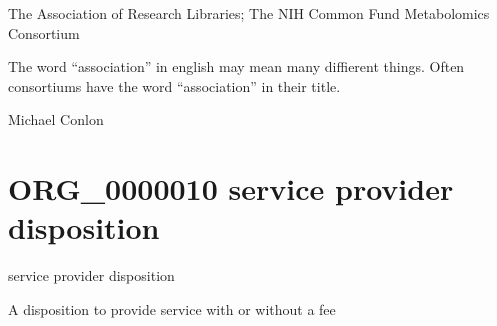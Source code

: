 \documentclass[letterpaper,10pt,english]{sphinxmanual}
\begin{document}
\begin{sphinxShadowBox}

\sphinxAtStartPar
The Association of Research Libraries; The NIH Common Fund Metabolomics Consortium
\end{sphinxShadowBox}

\begin{sphinxShadowBox}

\sphinxAtStartPar
The word “association” in english may mean many diffierent things.  Often consortiums have the word “association” in their title.
\end{sphinxShadowBox}

\begin{sphinxShadowBox}

\sphinxAtStartPar
Michael Conlon 
\end{sphinxShadowBox}
\begin{quote}
\label{\detokenize{doc-ORG_0000010:org-0000010}}\label{\detokenize{doc-ORG_0000010:service-provider-disposition}}\label{\detokenize{doc-ORG_0000010:org-0000010}}
\ignorespaces \end{quote}


\section{ORG\_0000010 \sphinxhyphen{} service provider disposition}
\label{\detokenize{doc-ORG_0000010:org-0000010-service-provider-disposition}}\label{\detokenize{doc-ORG_0000010:index-0}}\label{\detokenize{doc-ORG_0000010::doc}}
\begin{sphinxShadowBox}

\sphinxAtStartPar
service provider disposition
\end{sphinxShadowBox}

\begin{sphinxShadowBox}

\sphinxAtStartPar
A disposition to provide service with or without a fee
\end{sphinxShadowBox}
\end{document}
